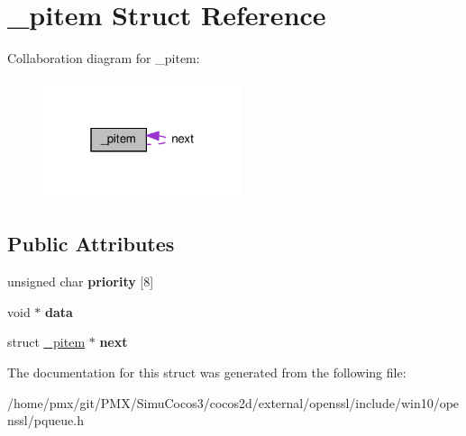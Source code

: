 \hypertarget{struct__pitem}{}\section{\+\_\+pitem Struct Reference}
\label{struct__pitem}


Collaboration diagram for \+\_\+pitem\+:
\nopagebreak
\begin{figure}[H]
\begin{center}
\leavevmode
\includegraphics[width=166pt]{struct__pitem__coll__graph}
\end{center}
\end{figure}
\subsection*{Public Attributes}
\begin{DoxyCompactItemize}
\item 
\mbox{\label{struct__pitem_af285b88224fe1db6562c5bf6208a995c}} 
unsigned char {\bfseries priority} \mbox{[}8\mbox{]}
\item 
\mbox{\label{struct__pitem_ab57fcd99b0053a93df6e10cc5adb6401}} 
void $\ast$ {\bfseries data}
\item 
\mbox{\label{struct__pitem_aabdda0dcbfb04b14c640d4a117d0061f}} 
struct \hyperlink{struct__pitem}{\+\_\+pitem} $\ast$ {\bfseries next}
\end{DoxyCompactItemize}


The documentation for this struct was generated from the following file\+:\begin{DoxyCompactItemize}
\item 
/home/pmx/git/\+P\+M\+X/\+Simu\+Cocos3/cocos2d/external/openssl/include/win10/openssl/pqueue.\+h\end{DoxyCompactItemize}
